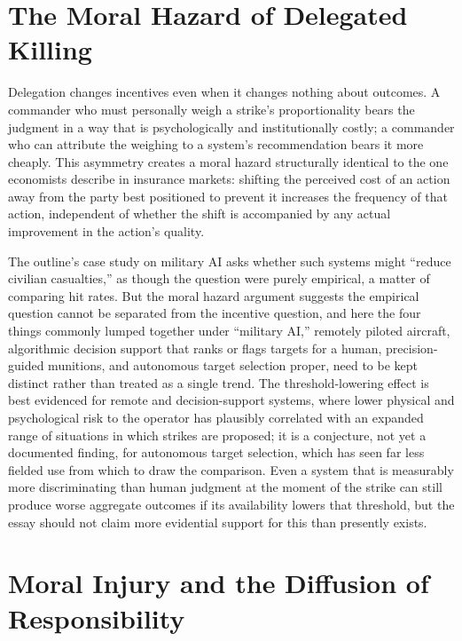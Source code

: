 \documentclass[11pt]{article}
\begin{document}
\section{The Moral Hazard of Delegated Killing}

Delegation changes incentives even when it changes nothing about outcomes. A commander who must personally weigh a strike's proportionality bears the judgment in a way that is psychologically and institutionally costly; a commander who can attribute the weighing to a system's recommendation bears it more cheaply. This asymmetry creates a moral hazard structurally identical to the one economists describe in insurance markets: shifting the perceived cost of an action away from the party best positioned to prevent it increases the frequency of that action, independent of whether the shift is accompanied by any actual improvement in the action's quality.

The outline's case study on military AI asks whether such systems might ``reduce civilian casualties,'' as though the question were purely empirical, a matter of comparing hit rates. But the moral hazard argument suggests the empirical question cannot be separated from the incentive question, and here the four things commonly lumped together under ``military AI,'' remotely piloted aircraft, algorithmic decision support that ranks or flags targets for a human, precision-guided munitions, and autonomous target selection proper, need to be kept distinct rather than treated as a single trend. The threshold-lowering effect is best evidenced for remote and decision-support systems, where lower physical and psychological risk to the operator has plausibly correlated with an expanded range of situations in which strikes are proposed; it is a conjecture, not yet a documented finding, for autonomous target selection, which has seen far less fielded use from which to draw the comparison. Even a system that is measurably more discriminating than human judgment at the moment of the strike can still produce worse aggregate outcomes if its availability lowers that threshold, but the essay should not claim more evidential support for this than presently exists.

\section{Moral Injury and the Diffusion of Responsibility}
\end{document}

